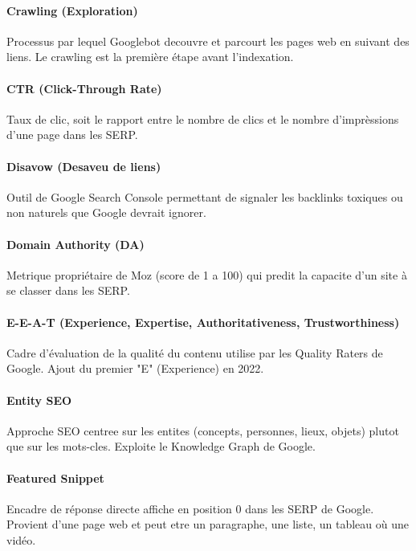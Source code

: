 \paragraph*{Crawling (Exploration)}
Processus par lequel Googlebot decouvre et parcourt les pages web en suivant des liens. Le crawling est la première étape avant l'indexation.

\paragraph*{CTR (Click-Through Rate)}
Taux de clic, soit le rapport entre le nombre de clics et le nombre d'imprèssions d'une page dans les SERP.

\paragraph*{Disavow (Desaveu de liens)}
Outil de Google Search Console permettant de signaler les backlinks toxiques ou non naturels que Google devrait ignorer.

\paragraph*{Domain Authority (DA)}
Metrique propriétaire de Moz (score de 1 a 100) qui predit la capacite d'un site à se classer dans les SERP.

\paragraph*{E-E-A-T (Experience, Expertise, Authoritativeness, Trustworthiness)}
Cadre d'évaluation de la qualité du contenu utilise par les Quality Raters de Google. Ajout du premier "E" (Experience) en 2022.

\paragraph*{Entity SEO}
Approche SEO centree sur les entites (concepts, personnes, lieux, objets) plutot que sur les mots-cles. Exploite le Knowledge Graph de Google.

\paragraph*{Featured Snippet}
Encadre de réponse directe affiche en position 0 dans les SERP de Google. Provient d'une page web et peut etre un paragraphe, une liste, un tableau où une vidéo.

